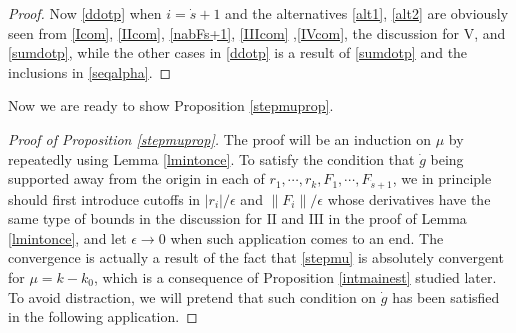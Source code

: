 \documentclass[11pt,reqno]{amsart}
\numberwithin{equation}{section}
\theoremstyle{definition}
\begin{document}
\begin{proof}
	Now \eqref{ddotp} when $i=\dot{s}+1$ and the alternatives \eqref{alt1}, \eqref{alt2} are obviously seen from \eqref{Icom}, \eqref{IIcom}, \eqref{nabFs+1}, \eqref{IIIcom} ,\eqref{IVcom}, the discussion for $\mathrm{V}$, and \eqref{sumdotp}, while the other cases in \eqref{ddotp} is a result of \eqref{sumdotp} and the inclusions in \eqref{seqalpha}.
\end{proof}

Now we are ready to show Proposition \ref{stepmuprop}.

\begin{proof}[Proof of Proposition \ref{stepmuprop}]
	The proof will be an induction on $\mu$ by repeatedly using Lemma \ref{lmintonce}. To satisfy the condition that $\dot{g}$ being supported away from the origin in each of $r_1,\cdots,r_k,F_1,\cdots,F_{\dot{s}+1}$, we in principle should first introduce cutoffs in $|r_i|/\epsilon$ and $\|F_i\|/\epsilon$ whose derivatives have the same type of bounds in the discussion for $\mathrm{II}$ and $\mathrm{III}$ in the proof of Lemma \ref{lmintonce}, and let $\epsilon\rightarrow0$ when such application comes to an end. The convergence is actually a result of the fact that \eqref{stepmu} is absolutely convergent for $\mu=k-k_0$, which is a consequence of Proposition \ref{intmainest} studied later. To avoid distraction, we will pretend that such condition on $\dot{g}$ has been satisfied in the following application.
	

\end{proof}
\end{document}
